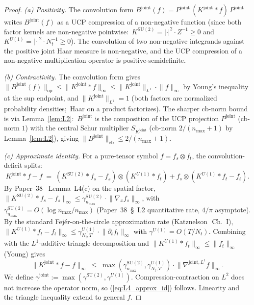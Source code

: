 \documentclass[11pt,a4paper]{article}
\theoremstyle{plain}
\theoremstyle{definition}
\newcommand{\nmax}{n_{\max}}
\newcommand{\Nt}{N_{t}}
\newcommand{\opnorm}[1]{\lVert #1 \rVert_{\mathrm{op}}}
\newcommand{\cbnorm}[1]{\lVert #1 \rVert_{\mathrm{cb}}}
\newcommand{\norm}[1]{\lVert #1 \rVert}
\newcommand{\SU}{\mathrm{SU}}
\newcommand{\Uone}{U(1)}
\newcommand{\Bjoint}{B^{\mathrm{joint}}}
\newcommand{\Pjoint}{P^{\mathrm{joint}}}
\newcommand{\Kjoint}{K^{\mathrm{joint}}}
\newcommand{\KSU}{K^{\SU(2)}}
\newcommand{\KU}{K^{\Uone}}
\newcommand{\gammajoint}{\gamma^{\mathrm{joint}}}
\newcommand{\gammaSU}{\gamma^{\SU(2)}}
\newcommand{\gammaU}{\gamma^{\Uone}}
\begin{document}
\begin{proof}
\emph{(a) Positivity.} The convolution form
$\Bjoint(f) = \Pjoint\,(\Kjoint \ast f)\,\Pjoint$ writes $\Bjoint(f)$
as a UCP compression of a non-negative function (since both factor
kernels are non-negative pointwise:\ $\KSU = |{\cdot}|^{2} \cdot Z^{-1}
\ge 0$ and $\KU = |{\cdot}|^{2} \cdot \Nt^{-1} \ge 0$). The convolution
of two non-negative integrands against the positive joint Haar measure
is non-negative, and the UCP compression of a non-negative multiplication
operator is positive-semidefinite.

\emph{(b) Contractivity.} The convolution form gives
$\opnorm{\Bjoint(f)} \le \norm{\Kjoint \ast f}_{\infty} \le
\norm{\Kjoint}_{L^{1}} \cdot \norm{f}_{\infty}$ by Young's inequality
at the sup endpoint, and $\norm{\Kjoint}_{L^{1}} = 1$ (both factors
are normalized probability densities;\ Haar on a product factorizes).
The sharper cb-norm bound is via Lemma~\ref{lem:L2}:\ $\Bjoint$ is the
composition of the UCP projection $\Pjoint$ (cb-norm $1$) with the
central Schur multiplier $S_{\Kjoint}$ (cb-norm $2/(\nmax + 1)$ by
Lemma~\ref{lem:L2}), giving $\cbnorm{\Bjoint} \le 2/(\nmax + 1)$.

\emph{(c) Approximate identity.} For a pure-tensor symbol
$f = f_{s} \otimes f_{t}$, the convolution-deficit splits:
\begin{equation*}
   \Kjoint \ast f - f
   \;=\; (\KSU \ast f_{s} - f_{s}) \otimes (\KU \ast f_{t})
       + f_{s} \otimes (\KU \ast f_{t} - f_{t}).
\end{equation*}
By Paper~38~\cite{paper38} Lemma~L4(c) on the spatial factor,
$\norm{\KSU \ast f_{s} - f_{s}}_{\infty} \le \gammaSU_{\nmax} \cdot
\norm{\nabla_{x} f_{s}}_{\infty}$, with $\gammaSU_{\nmax} =
O(\log\nmax / \nmax)$ (Paper~38~\S~L2 quantitative rate, $4/\pi$
asymptote). By the standard Fej\'er-on-the-circle approximation rate
(Katznelson~\cite{katznelson2004}\,Ch.~I), $\norm{\KU \ast f_{t} -
f_{t}}_{\infty} \le \gammaU_{\Nt, T} \cdot \norm{\partial_{t}
f_{t}}_{\infty}$ with $\gammaU = O(T/\Nt)$. Combining with the
$L^{1}$-additive triangle decomposition and $\norm{\KU \ast f_{t}}_{\infty}
\le \norm{f_{t}}_{\infty}$ (Young) gives
\begin{equation*}
   \norm{\Kjoint \ast f - f}_{\infty}
   \;\le\; \max(\gammaSU_{\nmax}, \gammaU_{\Nt, T}) \cdot
            \norm{\nabla^{\mathrm{joint}, L^{1}} f}_{\infty}.
\end{equation*}
We define $\gammajoint := \max(\gammaSU, \gammaU)$. Compression-contraction
on $L^{2}$ does not increase the operator norm, so (\ref{eq:L4_approx_id})
follows. Linearity and the triangle inequality extend to general $f$.


\end{proof}
\end{document}
